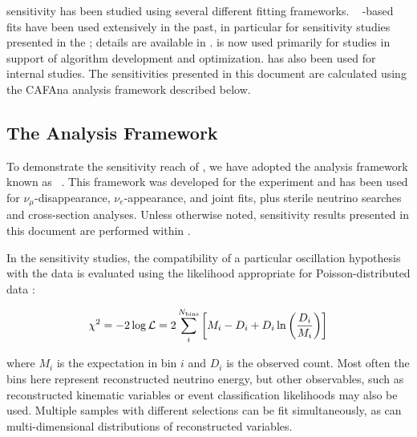  sensitivity has been studied using several different fitting frameworks. ~\cite{Huber:2004ka,Huber:2007ji} 
-based fits have been used extensively in the past, in particular for sensitivity studies presented in the  ; details are available in \cite{Acciarri:2015uup,Alion:2016uaj,Bass:2014vta}.  is now used primarily for studies in support of algorithm development and optimization. \cite{valorweb} has also been used for internal studies.  The sensitivities presented in this document are calculated using the CAFAna analysis framework described below. 



\subsection{The  Analysis Framework}
\label{sect:methods-cafana}

To demonstrate the sensitivity reach of , we have adopted the analysis framework known as ~\cite{CAFAna}. This framework was developed for the  experiment and has been used for $\nu_\mu$-disappearance, $\nu_e$-appearance, and joint fits, plus sterile neutrino searches and cross-section analyses.  Unless otherwise noted, sensitivity results presented in this document are performed within . %

In the sensitivity studies, the compatibility of a particular oscillation hypothesis with the data is evaluated using the likelihood appropriate for Poisson-distributed data \cite{Tanabashi:2018oca}:

\begin{equation}
    \chi^2 = -2\log\mathcal{L} = 2\sum_i^{N_{\rm bins}}\left[ M_i-D_i+D_i\ln\left({D_i\over M_i}\right) \right]
\end{equation}

where $M_i$ is the  %
expectation in bin $i$ and $D_i$ is the observed count. Most often the bins here represent reconstructed neutrino energy, but other observables, such as reconstructed kinematic variables or event classification likelihoods may also be used. Multiple samples with different selections can be fit simultaneously, as can multi-dimensional distributions of reconstructed variables.

